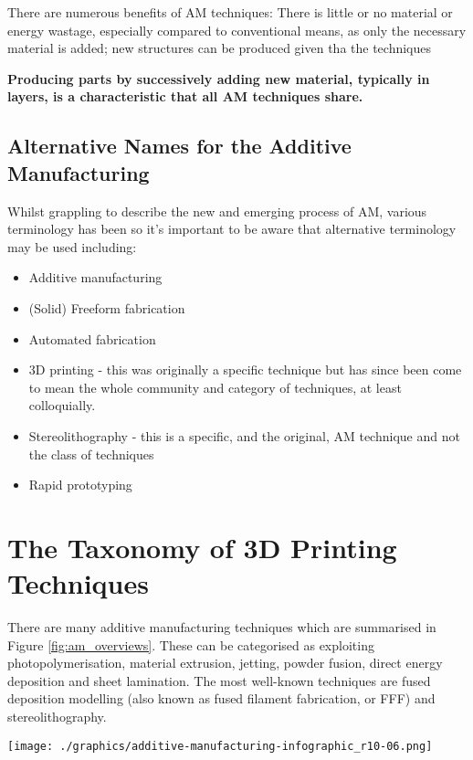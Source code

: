 There are numerous benefits of AM techniques: There is little or no material or energy wastage, especially compared to conventional means, as only the necessary material is added; new structures can be produced given tha the techniques 

\textbf{Producing parts by successively adding new material, typically in layers, is a characteristic that all AM techniques share.}

\subsection{Alternative Names for the Additive Manufacturing}

Whilst grappling to describe the new and emerging process of AM, various terminology has been so it's important to be aware that alternative terminology may be used including: 
\begin{itemize}
 \item Additive manufacturing
 \item (Solid) Freeform fabrication 
 \item Automated fabrication 
 \item 3D printing - this was originally a specific technique but has since been come to mean the whole community and category of techniques, at least colloquially. 
 \item Stereolithography - this is a specific, and the original, AM technique and not the class of techniques 
 \item Rapid prototyping 
\end{itemize}


\section{The Taxonomy of 3D Printing Techniques}

There are many additive manufacturing techniques which are summarised in Figure \ref{fig:am_overviews}. These can be categorised as exploiting photopolymerisation, material extrusion, jetting, powder fusion, direct energy deposition and sheet lamination. The most well-known techniques are fused deposition modelling (also known as fused filament fabrication, or FFF) and stereolithography. 

\begin{sidewaysfigure}[ht!!]
 \centering
 \texttt{[image: ./graphics/additive-manufacturing-infographic\_r10-06.png]}
 \caption{An overview of different techniques and manufacturers, provided by 3DHubs.}
 \label{fig:am_overviews}
\end{sidewaysfigure}


